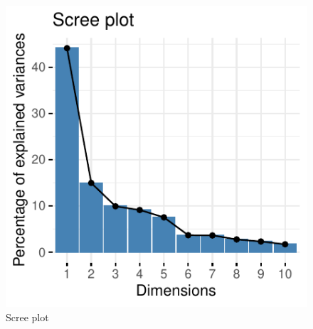 \documentclass[11pt,]{article}
\begin{document}
\begin{figure}

{\centering \includegraphics{stock_analysis_files/figure-latex/scree-1} 

}

\caption{Scree plot}\label{fig:scree}
\end{figure}
\end{document}
